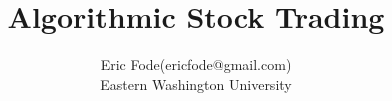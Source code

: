 \documentclass [11pt]{article}
\title{Algorithmic Stock Trading}
\author{Eric Fode(ericfode@gmail.com)\\Eastern Washington University}
\begin{document}
\maketitle
\nocite{*}


\end{document}
